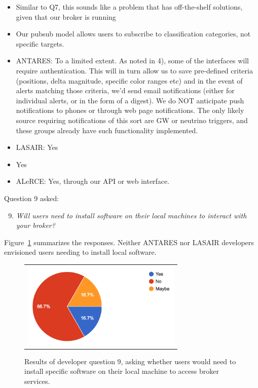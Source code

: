 \documentclass{article}
\begin{document}
\begin{itemize}
\item Similar to Q7, this sounds like a problem that has off-the-shelf solutions, given that our broker is running 
\item Our pubsub model allows users to subscribe to classification categories, not specific targets.
\item ANTARES: To a limited extent. As noted in 4), some of the interfaces will require authentication. This will in turn allow us to save pre-defined criteria (positions, delta magnitude, specific color ranges etc) and in the event of alerts matching those criteria, we’d send email notifications (either for individual alerts, or in the form of a digest). We do NOT anticipate push notifications to phones or through web page notifications. The only likely source requiring notifications of this sort are GW or neutrino triggers, and these groups already have such functionality implemented.
\item LASAIR: Yes 
\item Yes
\item ALeRCE: Yes, through our API or web interface.
\end{itemize}

Question 9 asked:
\begin{enumerate}
\setcounter{enumi}{8}
\item {\em Will users need to install software on their local machines to interact with your broker?}
\end{enumerate}

Figure~\ref{fig:broker_software} summarizes the responses.  Neither ANTARES nor LASAIR developers envisioned users needing to install local software. 

\begin{figure}[ht]
\centering
\begin{tabular}{c}
\includegraphics[width=3in]{figures/developer_question_9.png}
\end{tabular}
\caption{Results of developer question 9, asking whether users would need to install specific software on their local machine to access broker services.}
\label{fig:broker_software}
\end{figure}
\end{document}
